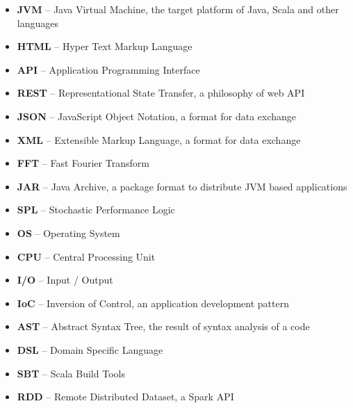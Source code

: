 \documentclass[12pt,a4paper]{report}
\begin{document}



\tableofcontents














\listoffigures

\listoftables


\begin{itemize}
	\item \textbf{JVM} -- Java Virtual Machine, the target platform of Java, Scala and other languages
	\item \textbf{HTML} -- Hyper Text Markup Language
	\item \textbf{API} -- Application Programming Interface
	\item \textbf{REST} -- Representational State Transfer, a philosophy of web API
	\item \textbf{JSON} -- JavaScript Object Notation, a format for data exchange
	\item \textbf{XML} -- Extensible Markup Language, a format for data exchange
	\item \textbf{FFT} -- Fast Fourier Transform
	\item \textbf{JAR} -- Java Archive, a package format to distribute JVM based applications
	\item \textbf{SPL} -- Stochastic Performance Logic
	\item \textbf{OS} -- Operating System
	\item \textbf{CPU} -- Central Processing Unit
	\item \textbf{I/O} -- Input / Output
	\item \textbf{IoC} -- Inversion of Control, an application development pattern
	\item \textbf{AST} -- Abstract Syntax Tree, the result of syntax analysis of a code
	\item \textbf{DSL} -- Domain Specific Language
	\item \textbf{SBT} -- Scala Build Tools
	\item \textbf{RDD} -- Remote Distributed Dataset, a Spark API
\end{itemize}
\end{document}
